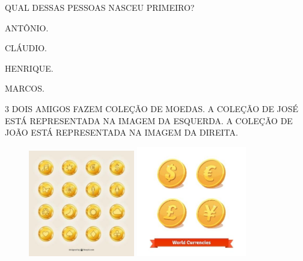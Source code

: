 QUAL DESSAS PESSOAS NASCEU PRIMEIRO?

\begin{escolha}
\item ANTÔNIO.

\item CLÁUDIO.

\item HENRIQUE.

\item MARCOS.
\end{escolha}


\num{3} DOIS AMIGOS FAZEM COLEÇÃO DE MOEDAS. A COLEÇÃO DE JOSÉ ESTÁ REPRESENTADA NA IMAGEM DA
ESQUERDA. A COLEÇÃO DE JOÃO ESTÁ REPRESENTADA NA IMAGEM DA DIREITA.


\begin{figure}[htpb!]
\centering
\includegraphics[width=1.82292in,height=1.82292in]{media/image111.jpg}
\includegraphics[width=1.88542in,height=1.88542in]{media/image112.jpg}
\end{figure}

